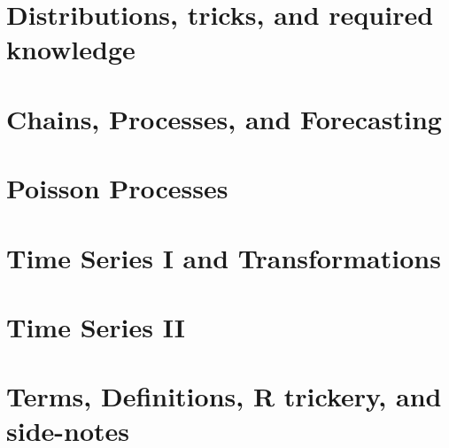 \documentclass[12pt]{report}
\begin{document}
\maketitle
\tableofcontents
\chapter{Distributions, tricks, and required knowledge}


\chapter{Chains, Processes, and Forecasting}

\chapter{Poisson Processes}

\chapter{Time Series I and Transformations}

\chapter{Time Series II}

\chapter{Terms, Definitions, R trickery, and side-notes}

\end{document}
